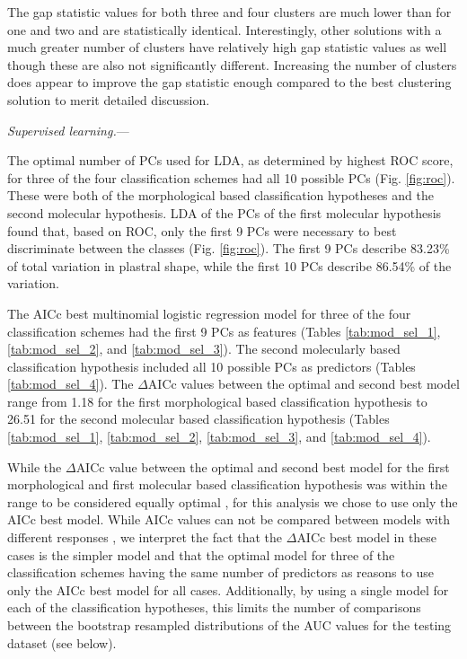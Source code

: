 \documentclass[12pt,letterpaper]{article}\usepackage{graphicx, color}
\renewcommand{\subsubsection}[1]{%
\vspace{2ex}
\noindent
\textit{#1.}---}
\begin{document}
The gap statistic values for both three and four clusters are much lower than for one and two and are statistically identical. Interestingly, other solutions with a much greater number of clusters have relatively high gap statistic values as well though these are also not significantly different. Increasing the number of clusters does appear to improve the gap statistic enough compared to the best clustering solution to merit detailed discussion.


\subsubsection{Supervised learning}


The optimal number of PCs used for LDA, as determined by highest ROC score, for three of the four classification schemes had all 10 possible PCs (Fig. \ref{fig:roc}). These were both of the morphological based classification hypotheses and the second molecular hypothesis. LDA of the PCs of the first molecular hypothesis found that, based on ROC, only the first 9 PCs were necessary to best discriminate between the classes (Fig. \ref{fig:roc}). The first 9 PCs describe 83.23\% of total variation in plastral shape, while the first 10 PCs describe 86.54\% of the variation.




The AICc best multinomial logistic regression model for three of the four classification schemes had the first 9 PCs as features (Tables \ref{tab:mod_sel_1}, \ref{tab:mod_sel_2}, and \ref{tab:mod_sel_3}). The second molecularly based classification hypothesis included all 10 possible PCs as predictors (Tables \ref{tab:mod_sel_4}).
The \(\Delta\)AICc values between the optimal and second best model range from 1.18 for the first morphological based classification hypothesis to 26.51 for the second molecular based classification hypothesis (Tables \ref{tab:mod_sel_1}, \ref{tab:mod_sel_2}, \ref{tab:mod_sel_3}, and \ref{tab:mod_sel_4}).

While the \(\Delta\)AICc value between the optimal and second best model for the first morphological and first molecular based classification hypothesis was within the range to be considered equally optimal \citep{Burnham2002a}, for this analysis we chose to use only the AICc best model. While AICc values can not be compared between models with different responses \citep{Burnham2002a}, we interpret the fact that the \(\Delta\)AICc best model in these cases is the simpler model and that the optimal model for three of the classification schemes having the same number of predictors as reasons to use only the AICc best model for all cases. 
Additionally, by using a single model for each of the classification hypotheses, this limits the number of comparisons between the bootstrap resampled distributions of the AUC values for the testing dataset (see below).
\end{document}
